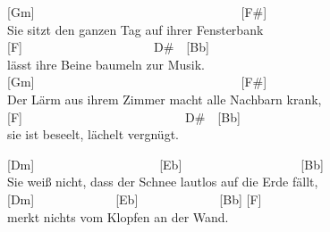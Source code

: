 \documentclass[
  letterpaper,
  twoside=false]{scrbook}
\begin{document}
{[}Gm{]}~~~~~~~~~~~~~~~~~~~~~~~~~~~~~~~~~{[}F\#{]}\\
Sie sitzt den ganzen Tag auf ihrer Fensterbank\\
{[}F{]}~~~~~~~~~~~~~~~~~~~~~D\#~~{[}Bb{]}\\
lässt ihre Beine baumeln zur Musik.\\
{[}Gm{]}~~~~~~~~~~~~~~~~~~~~~~~~~~~~~~~~~{[}F\#{]}\\
Der Lärm aus ihrem Zimmer macht alle Nachbarn krank,\\
{[}F{]}~~~~~~~~~~~~~~~~~~~~~~~~~~D\#~~{[}Bb{]}\\
sie ist beseelt, lächelt vergnügt.

{[}Dm{]}~~~~~~~~~~~~~~~~~~~~{[}Eb{]}~~~~~~~~~~~~~~~~~~~{[}Bb{]}\\
Sie weiß nicht, dass der Schnee lautlos auf die Erde fällt,\\
{[}Dm{]}~~~~~~~~~~~~~{[}Eb{]}~~~~~~~~~~~~~{[}Bb{]} {[}F{]}\\
merkt nichts vom Klopfen an der Wand.
\end{document}
